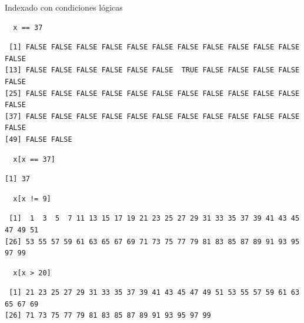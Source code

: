 \documentclass[xcolor={usenames,svgnames,dvipsnames}]{beamer}
\begin{document}
\begin{frame}[fragile,label=sec-3-2-2]{Indexado con condiciones lógicas}
 \lstset{language=R,label= ,caption= ,numbers=none}
\begin{lstlisting}
  x == 37
\end{lstlisting}

\begin{verbatim}
 [1] FALSE FALSE FALSE FALSE FALSE FALSE FALSE FALSE FALSE FALSE FALSE FALSE
[13] FALSE FALSE FALSE FALSE FALSE FALSE  TRUE FALSE FALSE FALSE FALSE FALSE
[25] FALSE FALSE FALSE FALSE FALSE FALSE FALSE FALSE FALSE FALSE FALSE FALSE
[37] FALSE FALSE FALSE FALSE FALSE FALSE FALSE FALSE FALSE FALSE FALSE FALSE
[49] FALSE FALSE
\end{verbatim}

\lstset{language=R,label= ,caption= ,numbers=none}
\begin{lstlisting}
  x[x == 37]
\end{lstlisting}

\begin{verbatim}
[1] 37
\end{verbatim}

\lstset{language=R,label= ,caption= ,numbers=none}
\begin{lstlisting}
  x[x != 9]
\end{lstlisting}

\begin{verbatim}
 [1]  1  3  5  7 11 13 15 17 19 21 23 25 27 29 31 33 35 37 39 41 43 45 47 49 51
[26] 53 55 57 59 61 63 65 67 69 71 73 75 77 79 81 83 85 87 89 91 93 95 97 99
\end{verbatim}

\lstset{language=R,label= ,caption= ,numbers=none}
\begin{lstlisting}
  x[x > 20]
\end{lstlisting}

\begin{verbatim}
 [1] 21 23 25 27 29 31 33 35 37 39 41 43 45 47 49 51 53 55 57 59 61 63 65 67 69
[26] 71 73 75 77 79 81 83 85 87 89 91 93 95 97 99
\end{verbatim}
\end{frame}
\end{document}
